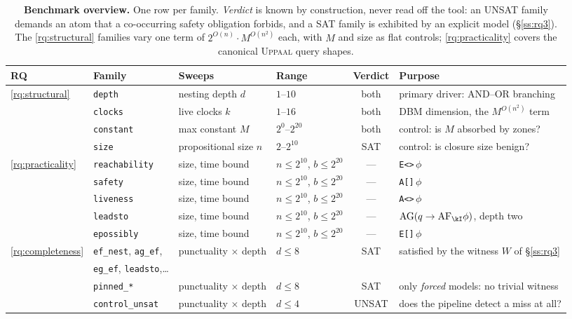 \begin{table}[t]\centering
\caption{\textbf{Benchmark overview.} One row per family. \emph{Verdict} is known by construction,
never read off the tool: an UNSAT family demands an atom that a co-occurring safety obligation
forbids, and a SAT family is exhibited by an explicit model (\S\ref{ss:rq3}). The
\ref{rq:structural} families vary one term of $2^{O(n)}\cdot M^{O(n^2)}$ each, with $M$ and size as
flat controls; \ref{rq:practicality} covers the canonical \textsc{Uppaal} query shapes.}
\label{tab:bench-overview}
\small\setlength{\tabcolsep}{4pt}
\begin{tabular}{llllcl}
\toprule
RQ & Family & Sweeps & Range & Verdict & Purpose \\
\midrule
\multirow{4}{*}{\ref{rq:structural}}
 & \texttt{depth}    & nesting depth $d$      & $1$--$10$          & both & primary driver: AND--OR branching \\
 & \texttt{clocks}   & live clocks $k$        & $1$--$16$          & both & DBM dimension, the $M^{O(n^2)}$ term \\
 & \texttt{constant} & max constant $M$       & $2^0$--$2^{20}$    & both & control: is $M$ absorbed by zones? \\
 & \texttt{size}     & propositional size $n$ & $2$--$2^{10}$      & SAT  & control: is closure size benign? \\
\midrule
\multirow{5}{*}{\ref{rq:practicality}}
 & \texttt{reachability} & size, time bound & $n\le2^{10}$, $b\le2^{20}$ & --- & \texttt{E<>}\,$\phi$ \\
 & \texttt{safety}       & size, time bound & $n\le2^{10}$, $b\le2^{20}$ & --- & \texttt{A[]}\,$\phi$ \\
 & \texttt{liveness}     & size, time bound & $n\le2^{10}$, $b\le2^{20}$ & --- & \texttt{A<>}\,$\phi$ \\
 & \texttt{leadsto}      & size, time bound & $n\le2^{10}$, $b\le2^{20}$ & --- & $\mathrm{AG}(q\rightarrow\mathrm{AF}_\kI\phi)$, depth two \\
 & \texttt{epossibly}    & size, time bound & $n\le2^{10}$, $b\le2^{20}$ & --- & \texttt{E[]}\,$\phi$ \\
\midrule
\multirow{4}{*}{\ref{rq:completeness}}
 & \texttt{ef\_nest}, \texttt{ag\_ef}, & \multirow{2}{*}{punctuality $\times$ depth} &
   \multirow{2}{*}{$d\le8$} & \multirow{2}{*}{SAT} &
   \multirow{2}{*}{satisfied by the witness $W$ of \S\ref{ss:rq3}} \\
 & \texttt{eg\_ef}, \texttt{leadsto},\dots & & & & \\
 & \texttt{pinned\_*}   & punctuality $\times$ depth & $d\le8$ & SAT   & only \emph{forced} models: no trivial witness \\
 & \texttt{control\_unsat} & punctuality $\times$ depth & $d\le4$ & UNSAT & does the pipeline detect a miss at all? \\
\bottomrule
\end{tabular}
\end{table}

